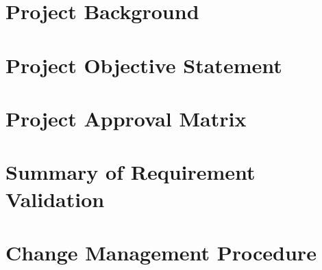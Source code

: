 \documentclass[letterpaper, 11pt, twoside, article]{memoir}
\begin{document}



%


\chapter{Project Background}



\clearpage

\chapter{Project Objective Statement}



\chapter{Project Approval Matrix}


   
   \break



     
\chapter{Summary of Requirement Validation}


  
\chapter{Change Management Procedure}


   
 {
}

\clearpage
\pagestyle{empty}



\clearpage
\end{document}
